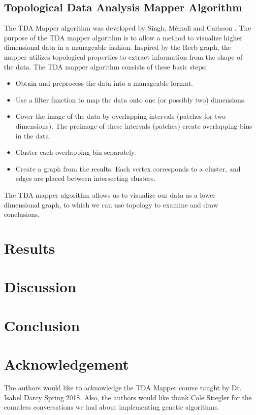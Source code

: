 \documentclass[english]{article}
\begin{document}
\subsection{Topological Data Analysis Mapper Algorithm}
The TDA Mapper algorithm was developed by Singh, M\'{e}moli and Carlsson \cite{singh2007topological}. 
The purpose of the TDA mapper algorithm is to allow a method to visualize higher dimensional data in a manageable fashion.
Inspired by the Reeb graph, the mapper utilizes topological properties to extract information from the shape of the data. 
The TDA mapper algorithm consists of these basic steps:
\begin{itemize}
 \item Obtain and preprocess the data into a manageable format.
 \item Use a filter function to map the data onto one (or possibly two) dimensions. 
 \item Cover the image of the data by overlapping intervals (patches for two dimensions). The preimage of these intervals (patches) create overlapping bins in the data.
 \item Cluster each overlapping bin separately.
 \item Create a graph from the results. Each vertex corresponds to a cluster, and edges are placed between intersecting clusters.
\end{itemize}
The TDA mapper algorithm allows us to visualize our data as a lower dimensional graph, to which we can use topology to examine and draw conclusions.
\section{Results}
\section{Discussion}
\section{Conclusion}
\section{Acknowledgement}

The authors would like to acknowledge the TDA Mapper course taught
by Dr. Isabel Darcy Spring 2018. Also, the authors would like thank
Cole Stiegler for the countless conversations we had about implementing
genetic algorithms.
\end{document}
